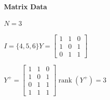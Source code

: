\documentclass[11pt]{article}
\begin{document}
\noindent\textbf{Matrix Data}
\par $N=3$
\par $I=\{4,5,6\}$\quad$Y=\begin{bmatrix}1 & 1 & 0 \\ 1 & 0 & 1 \\ 0 & 1 & 1\end{bmatrix}$
\par $Y^{+}=\begin{bmatrix}1 & 1 & 0 \\ 1 & 0 & 1 \\ 0 & 1 & 1 \\ 1 & 1 & 1\end{bmatrix}$\quad$\operatorname{rank}(Y^{+})=3$
\end{document}
